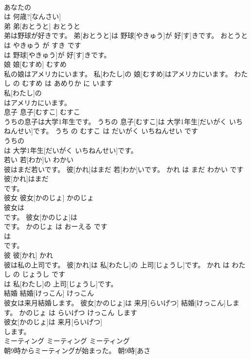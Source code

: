 \documentclass[8pt]{extreport}
\begin{document}
\begin{CJK}{UTF8}{min}
\\	あなたの
\\	は 何歳?[なんさい]		
\\	弟	弟[おとうと]	おとうと	
\\	弟は野球が好きです。	弟[おとうと]は 野球[やきゅう]が 好[す]きです。	おとうと は やきゅう が すき です	
\\	は 野球[やきゅう]が 好[す]きです。		
\\	娘	娘[むすめ]	むすめ	
\\	私の娘はアメリカにいます。	私[わたし]の 娘[むすめ]はアメリカにいます。	わたし の むすめ は あめりか に います	
\\	私[わたし]の
\\	はアメリカにいます。		
\\	息子	息子[むすこ]	むすこ	
\\	うちの息子は大学1年生です。	うちの 息子[むすこ]は 大学1年生[だいがく いちねんせい]です。	うち の むすこ は だいがく いちねんせい です	
\\	うちの
\\	は 大学1年生[だいがく いちねんせい]です。		
\\	若い	若[わか]い	わかい	
\\	彼はまだ若いです。	彼[かれ]はまだ 若[わか]いです。	かれ は まだ わかい です	
\\	彼[かれ]はまだ
\\	です。		
\\	彼女	彼女[かのじょ]	かのじょ	
\\	彼女は
\\	です。	彼女[かのじょ]は 
\\	[おーえる]です。	かのじょ は おーえる です	
\\	は 
\\	[おーえる]です。		
\\	彼	彼[かれ]	かれ	
\\	彼は私の上司です。	彼[かれ]は 私[わたし]の 上司[じょうし]です。	かれ は わたし の じょうし です	
\\	は 私[わたし]の 上司[じょうし]です。		
\\	結婚	結婚[けっこん]	けっこん	
\\	彼女は来月結婚します。	彼女[かのじょ]は 来月[らいげつ] 結婚[けっこん]します。	かのじょ は らいげつ けっこん します	
\\	彼女[かのじょ]は 来月[らいげつ]
\\	します。		
\\	ミーティング	ミーティング	ミーティング	
\\	朝9時からミーティングが始まった。	朝9時[あさ 

\end{CJK}
\end{document}
